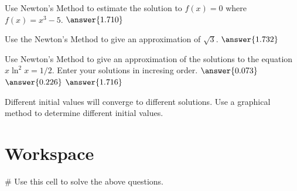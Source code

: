 \documentclass{ximera}
\begin{document}
\begin{question}
	Use Newton's Method to estimate the solution to $f(x)=0$ where $f(x)=x^3-5$. $\answer{1.710}$ 
\end{question}

\begin{question}
	Use the Newton's Method to give an approximation of $\sqrt{3}$. $\answer{1.732}$
\end{question}

\begin{question}
	Use Newton's Method to give an approximation of the solutions to the equation $x\ln^2{x}=1/2$. Enter your solutions in incresing order. $\answer{0.073}$ $\answer{0.226}$ $\answer{1.716}$
	\begin{hint}
	Different initial values will converge to different solutions. Use a graphical method to determine different initial values.
	\end{hint}
\end{question}

\section{Workspace}

\begin{sageCell}
# Use this cell to solve the above questions.
\end{sageCell}
\end{document}
